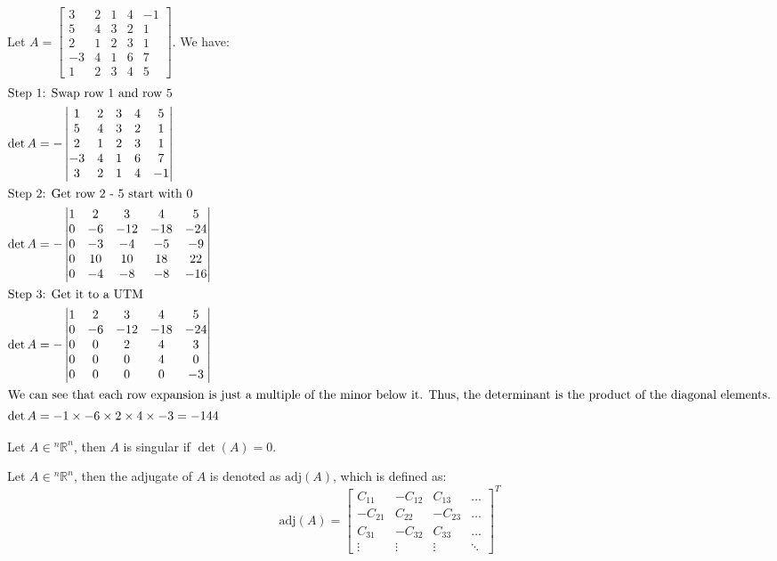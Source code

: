 \documentclass[11pt]{report}
\begin{document}
\begin{example}
    Let $A = \begin{bmatrix} 3 & 2 & 1 & 4 & -1 \\ 5 & 4 & 3 & 2 & 1 \\ 2 & 1 & 2 & 3 & 1 \\ -3 & 4 & 1 & 6 & 7 \\ 1 & 2 & 3 & 4 & 5 \end{bmatrix}$. We have:
    \begin{align*}
        \intertext{Step 1: Swap row 1 and row 5}
        \det A &= -\begin{vmatrix} 1 & 2 & 3 & 4 & 5 \\ 5 & 4 & 3 & 2 & 1 \\ 2 & 1 & 2 & 3 & 1 \\ -3 & 4 & 1 & 6 & 7 \\ 3 & 2 & 1 & 4 & -1 \end{vmatrix} \\
        \intertext{Step 2: Get row 2 - 5 start with 0}
        \det A &= -\begin{vmatrix} 1 & 2 & 3 & 4 & 5 \\ 0 & -6 &-12 & -18 & -24 \\ 0 & -3 & -4 & -5 & -9 \\ 0 & 10 & 10 & 18 & 22 \\ 0 & -4 & -8 & -8 & -16 \end{vmatrix} \\
        \intertext{Step 3: Get it to a UTM}
        \det A &= -\begin{vmatrix} 1 & 2 & 3 & 4 & 5 \\ 0 & -6 &-12 & -18 & -24 \\ 0 & 0 & 2 & 4 & 3 \\ 0 & 0 & 0 & 4 & 0 \\ 0 & 0 & 0 & 0 & -3 \end{vmatrix} \\
        \intertext{We can see that each row expansion is just a multiple of the minor below it. Thus, the determinant is the product of the diagonal elements.}
        \det A &= -1 \times -6 \times 2 \times 4 \times -3 = -144
    \end{align*}
\end{example}
\begin{definition}
    Let $A \in  {^n\mathbb{R}^n}$, then $A$ is singular if $\det(A) = 0$.
\end{definition}
\begin{definition}
    Let $A \in  {^n\mathbb{R}^n}$, then the adjugate of $A$ is denoted as $\text{adj}(A)$, which is defined as:
    \begin{equation}
        \text{adj}(A) = \begin{bmatrix} C_{11} & -C_{12} & C_{13} & \ldots \\ -C_{21} & C_{22} & -C_{23} & \ldots \\ C_{31} & -C_{32} & C_{33} & \ldots \\ \vdots & \vdots & \vdots & \ddots \end{bmatrix}^T
    \end{equation}
\end{definition}
\end{document}
